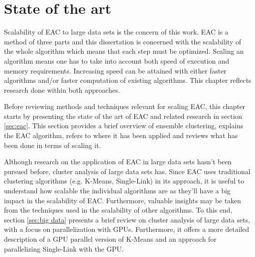 
\chapter{State of the art}
\label{chapter:stateofart}




Scalability of EAC to large data sets is the concern of this work.
EAC is a method of three parts and this dissertation is concerned with the scalability of the whole algorithm which means that each step must be optimized.
Scaling an algorithm means one has to take into account both speed of execution and memory requirements.
Increasing speed can be attained with either faster algorithms and/or faster computation of existing algorithms.
This chapter reflects research done within both approaches.

Before reviewing methods and techniques relevant for scaling EAC, this chapter starts by presenting the state of the art of EAC and related research in section \ref{sec:eac}.
This section provides a brief overview of ensemble clustering, explains the EAC algorithm, refers to where it has been applied and reviews what has been done in terms of scaling it.

Although research on the application of EAC in large data sets hasn't been pursued before, cluster analysis of large data sets has. 
Since EAC uses traditional clustering algorithms (e.g. K-Means, Single-Link) in its approach, it is useful to understand how scalable the individual algorithms are as they'll have a big impact in the scalability of EAC.
Furthermore, valuable insights may be taken from the techniques used in the scalability of other algorithms.
To this end, section \ref{sec:big data} presents a brief review on cluster analysis of large data sets, with a focus on parallelization with GPUs.
Furthermore, it offers a more detailed description of a GPU parallel version of K-Means and an approach for parallelizing Single-Link with the GPU.

